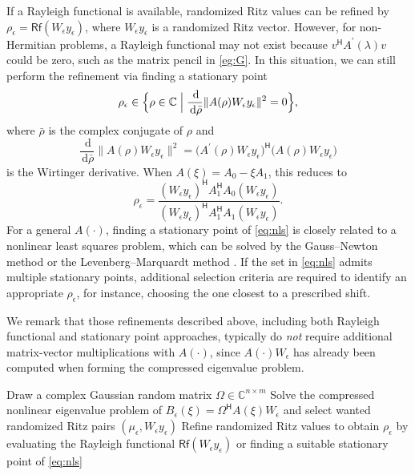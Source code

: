 \documentclass[a4paper,11pt]{article}
\newcommand{\Htran}{\mathsf{H}}
\newcommand{\de}{\,\mathrm{d}}
\newcommand{\Rq}{\mathsf{Rf}}
\newcommand{\C}{\mathbb{C}}
\providecommand{\norm}[1]{\lVert#1\rVert}
\begin{document}
If a Rayleigh functional is available,  randomized Ritz values can be refined by $\rho_{\epsilon}=\Rq(W_{\epsilon}y_{\epsilon})$, where $W_{\epsilon}y_{\epsilon}$ is a randomized Ritz vector.  
However, for non-Hermitian problems, a Rayleigh functional may not exist because $v^{\Htran}A^{\prime}(\lambda)v$ could be zero, such as the matrix pencil in \cref{eg:G}. In this situation, we can still perform the refinement via finding a stationary point 
\begin{equation}
    \label{eq:nls}
    \rho_{\epsilon} \in \Bigl\{ \rho\in\C \Bigm\vert \frac{\de }{\de \bar{\rho}} \norm{A(\rho)W_{\epsilon}y_{\epsilon}}^{2} = 0  \Bigr\},
\end{equation}
where $\bar{\rho}$ is the complex conjugate of $\rho$ and 
\begin{equation*}
    \frac{\de }{\de \bar{\rho}} \norm{A(\rho)W_{\epsilon}y_{\epsilon}}^{2} = \bigl(A^{\prime}(\rho)W_{\epsilon}y_{\epsilon}\bigr)^{\Htran}\bigl(A(\rho)W_{\epsilon}y_{\epsilon}\bigr)
\end{equation*}
is the Wirtinger derivative.
When $A(\xi)=A_{0}-\xi A_{1}$, this reduces to 
\begin{equation*}
    \rho_{\epsilon} = \frac{(W_{\epsilon}y_{\epsilon})^{\Htran}A_{1}^{\Htran}A_{0}(W_{\epsilon}y_{\epsilon})}{(W_{\epsilon}y_{\epsilon})^{\Htran}A_{1}^{\Htran}A_{1}(W_{\epsilon}y_{\epsilon})}.
\end{equation*}
For a general $A(\cdot)$, finding a stationary point of \cref{eq:nls} is closely related to a nonlinear least squares problem, which can be solved by the Gauss--Newton method or the Levenberg--Marquardt method \cite[Chap.~10]{Nocedal2006}.
If the set in \cref{eq:nls} admits multiple stationary points, additional selection criteria are required to identify an appropriate $\rho_{\epsilon}$, for instance, choosing the one closest to a prescribed shift.

We remark that those refinements described above, including both Rayleigh functional and stationary point approaches, typically do \emph{not} require additional matrix-vector multiplications with $A(\cdot)$, since $A(\cdot)W_{\epsilon}$ has already been computed when forming the compressed eigenvalue problem.




\begin{algorithm2e}[H]
    \caption{RRR procedure for nonlinear eigenvalue problems}
    \label{alg:RRR}
    \KwIn{$A(\cdot)\in\C^{n\times n}$ and an orthonormal basis $W_{\epsilon}\in\C^{n\times m}$\;}
    Draw a complex Gaussian random matrix $\Omega\in\C^{n\times m}$\;
    Solve the compressed nonlinear eigenvalue problem of $B_{\epsilon}(\xi)=\Omega^{\Htran}A(\xi)W_{\epsilon}$ and select wanted randomized Ritz pairs $(\mu_{\epsilon}, W_{\epsilon}y_{\epsilon})$\;
    Refine randomized Ritz values to obtain $\rho_{\epsilon}$ by evaluating the Rayleigh functional $\Rq(W_{\epsilon}y_{\epsilon})$ or finding a suitable stationary point of \cref{eq:nls}\;
\end{algorithm2e}
\end{document}
